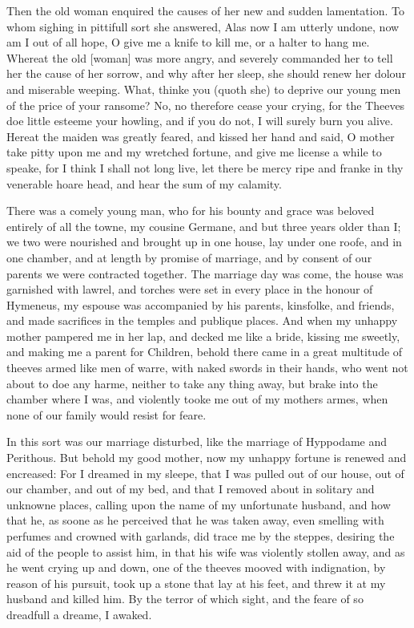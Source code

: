 Then the old woman enquired the causes of her new and sudden lamentation. To
whom sighing in pittifull sort she answered, Alas now I am utterly undone, now
am I out of all hope, O give me a knife to kill me, or a halter to hang me.
Whereat the old [woman] was more angry, and severely commanded her to tell her
the cause of her sorrow, and why after her sleep, she should renew her dolour
and miserable weeping. What, thinke you (quoth she) to deprive our young men of
the price of your ransome? No, no therefore cease your crying, for the Theeves
doe little esteeme your howling, and if you do not, I will surely burn you
alive. Hereat the maiden was greatly feared, and kissed her hand and said, O
mother take pitty upon me and my wretched fortune, and give me license a while
to speake, for I think I shall not long live, let there be mercy ripe and
franke in thy venerable hoare head, and hear the sum of my calamity.

There was a comely young man, who for his bounty and grace was beloved entirely
of all the towne, my cousine Germane, and but three years older than I; we two
were nourished and brought up in one house, lay under one roofe, and in one
chamber, and at length by promise of marriage, and by consent of our parents we
were contracted together. The marriage day was come, the house was garnished
with lawrel, and torches were set in every place in the honour of Hymeneus, my
espouse was accompanied by his parents, kinsfolke, and friends, and made
sacrifices in the temples and publique places. And when my unhappy mother
pampered me in her lap, and decked me like a bride, kissing me sweetly, and
making me a parent for Children, behold there came in a great multitude of
theeves armed like men of warre, with naked swords in their hands, who went not
about to doe any harme, neither to take any thing away, but brake into the
chamber where I was, and violently tooke me out of my mothers armes, when none
of our family would resist for feare.

In this sort was our marriage disturbed, like the marriage of Hyppodame and
Perithous. But behold my good mother, now my unhappy fortune is renewed and
encreased: For I dreamed in my sleepe, that I was pulled out of our house, out
of our chamber, and out of my bed, and that I removed about in solitary and
unknowne places, calling upon the name of my unfortunate husband, and how that
he, as soone as he perceived that he was taken away, even smelling with
perfumes and crowned with garlands, did trace me by the steppes, desiring the
aid of the people to assist him, in that his wife was violently stollen away,
and as he went crying up and down, one of the theeves mooved with indignation,
by reason of his pursuit, took up a stone that lay at his feet, and threw it at
my husband and killed him. By the terror of which sight, and the feare of so
dreadfull a dreame, I awaked.

